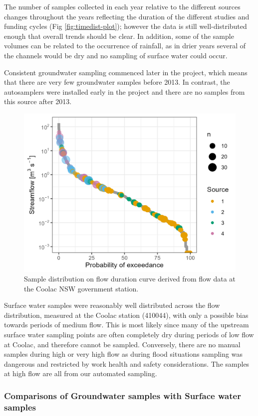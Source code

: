 \documentclass[, manuscript]{copernicus}
\begin{document}
The number of samples collected in each year relative to the different
sources changes throughout the years reflecting the duration of the
different studies and funding cycles (Fig \ref{fig:timedist-plot});
however the data is still well-distributed enough that overall trends
should be clear. In addition, some of the sample volumes can be related
to the occurrence of rainfall, as in drier years several of the channels
would be dry and no sampling of surface water could occur.

Consistent groundwater sampling commenced later in the project, which
means that there are very few groundwater samples before 2013. In
contrast, the autosamplers were installed early in the project and there
are no samples from this source after 2013.

\begin{figure}
\includegraphics[width=0.8\linewidth]{Figures/FDC} \caption{Sample distribution on flow duration curve derived from flow data at the Coolac NSW government station.}\label{fig:FDC}
\end{figure}

Surface water samples were reasonably well distributed across the flow
distribution, measured at the Coolac station (410044), with only a
possible bias towards periods of medium flow. This is most likely since
many of the upstream surface water sampling points are often completely
dry during periods of low flow at Coolac, and therefore cannot be
sampled. Conversely, there are no manual samples during high or very
high flow as during flood situations sampling was dangerous and
restricted by work health and safety considerations. The samples at high
flow are all from our automated sampling.

\subsubsection{Comparisons of Groundwater samples with Surface water
samples}
\end{document}
